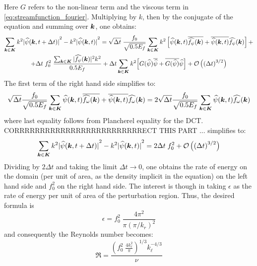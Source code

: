 \documentclass[../main.tex]{subfiles}
\begin{document}
Here $G$ refers to the non-linear term and the viscous term in \cref{eq:streamfunction_fourier}. Multiplying by $k$, then by the conjugate of the equation and summing over $\boldsymbol{k}$, one obtains:
\begin{multline}
	\sum_{\boldsymbol{k}\in\boldsymbol{K}} k^2{|\widehat{\psi}(\boldsymbol{k}, t+\Delta t)|}^2 - k^2{|\widehat{\psi}(\boldsymbol{k},t)|}^2 = \sqrt{\Delta t}\; \frac{f_0}{\sqrt{0.5 E_f}} \sum_{\boldsymbol{k}\in\boldsymbol{K}} k^2 \left[\widehat{\psi}(\boldsymbol{k},t) \overline{\widehat{f_\psi}(\boldsymbol{k})} + \overline{\widehat{\psi}(\boldsymbol{k},t)} \widehat{f_\psi}(\boldsymbol{k})\right]+\\+ \Delta t \; f_0^2\; \frac{\sum_{\boldsymbol{k}\in\boldsymbol{K}} |\widehat{f_\psi}(\boldsymbol{k})|^2 k^2}{0.5 E_f}+ \Delta t \sum_{\boldsymbol{k}\in\boldsymbol{K}} k^2 {\left[ G(\widehat{\psi}) \overline{\widehat{\psi}} + \overline{G(\widehat{\psi})} \widehat{\psi} \right]}
	+ \mathcal{O}\left({(\Delta t)}^{3/2}\right)
\end{multline}
The first term of the right hand side simplifies to:
\begin{equation}
	\sqrt{\Delta t} \frac{f_0}{\sqrt{0.5 E_f}} \sum_{\boldsymbol{k}\in\boldsymbol{K}} \widehat{\psi}(\boldsymbol{k},t) \overline{\widehat{f_\omega}(\boldsymbol{k})} + \overline{\widehat{\psi}(\boldsymbol{k},t)} \widehat{f_\omega}(\boldsymbol{k}) = 2\sqrt{\Delta t} \frac{f_0}{\sqrt{0.5 E_f}} \sum_{\boldsymbol{k}\in\boldsymbol{K}} \widehat{\psi}(\boldsymbol{k},t)\widehat{f_\omega}(\boldsymbol{k})
\end{equation}
where last equality follows from Plancherel equality for the DCT. CORRRRRRRRRRRRRRRRRRRRRRRRRECT THIS PART
... simplifies to:
\begin{equation}
	\sum_{\boldsymbol{k}\in\boldsymbol{K}} k^2{|\widehat{\psi}(\boldsymbol{k}, t+\Delta t)|}^2 - k^2{|\widehat{\psi}(\boldsymbol{k},t)|}^2 = 2\Delta t\; f_0^2 + \mathcal{O}\left({(\Delta t)}^{3/2}\right)
\end{equation}
Dividing by $2\Delta t$ and taking the limit $\Delta t \to 0$, one obtains the rate of energy on the domain (per unit of area, as the density implicit in the equation) on the left hand side and $f_0^2$ on the right hand side. The interest is though in taking $\epsilon$ as the rate of energy per unit of area of the perturbation region. Thus, the desired formula is
\begin{equation}
	\epsilon = f_0^2\; \frac{4 \pi^2}{\pi {(\pi / k_r)}^2}
\end{equation}
and consequently the Reynolds number becomes:
\begin{equation}\label{eq:reynolds}
	\Re = \frac{{\left( f_0^2\;\frac{4 k_r^2}{\pi} \right)}^{1/3} k_\ell^{-4/3}}{\nu}
\end{equation}
\end{document}
